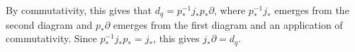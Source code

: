 \documentclass[10pt]{mypackage}
\begin{document}
\begin{solution}
\begin{center}
  \end{center}
  By commutativity, this gives that $d_q = p_{\ast}^{-1}j_{\ast}p_{\ast}\partial$, where $p_{\ast}^{-1}j_{\ast}$ emerges from the second diagram and $p_{\ast}\partial$ emerges from the first diagram and an application of commutativity. Since $p_{\ast}^{-1}j_{\ast}p_{\ast} = j_{\ast}$, this gives $j_{\ast}\partial = d_q$.
\end{solution}
\end{document}
